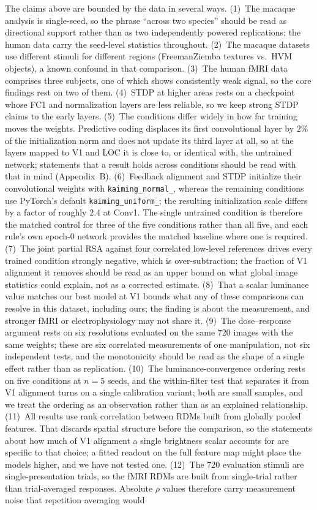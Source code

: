 \documentclass[10pt,twocolumn]{article}
\begin{document}
The claims above are bounded by the data in several ways. (1)~The macaque analysis is single-seed, so the phrase ``across two species'' should be read as directional support rather than as two independently powered replications; the human data carry the seed-level statistics throughout. (2)~The macaque datasets use different stimuli for different regions (FreemanZiemba textures vs.\ HVM objects), a known confound in that comparison. (3)~The human fMRI data comprises three subjects, one of which shows consistently weak signal, so the core findings rest on two of them. (4)~STDP at higher areas rests on a checkpoint whose FC1 and normalization layers are less reliable, so we keep strong STDP claims to the early layers. (5)~The conditions differ widely in how far training moves the weights. Predictive coding displaces its first convolutional layer by $2\%$ of the initialization norm and does not update its third layer at all, so at the layers mapped to V1 and LOC it is close to, or identical with, the untrained network; statements that a result holds across conditions should be read with that in mind (Appendix~B). (6)~Feedback alignment and STDP initialize their convolutional weights with \texttt{kaiming\_normal\_}, whereas the remaining conditions use PyTorch's default \texttt{kaiming\_uniform\_}; the resulting initialization scale differs by a factor of roughly $2.4$ at Conv1. The single untrained condition is therefore the matched control for three of the five conditions rather than all five, and each rule's own epoch-$0$ network provides the matched baseline where one is required. (7)~The joint partial RSA against four correlated low-level references drives every trained condition strongly negative, which is over-subtraction; the fraction of V1 alignment it removes should be read as an upper bound on what global image statistics could explain, not as a corrected estimate. (8)~That a scalar luminance value matches our best model at V1 bounds what any of these comparisons can resolve in this dataset, including ours; the finding is about the measurement, and stronger fMRI or electrophysiology may not share it. (9)~The dose--response argument rests on six resolutions evaluated on the same $720$ images with the same weights; these are six correlated measurements of one manipulation, not six independent tests, and the monotonicity should be read as the shape of a single effect rather than as replication. (10)~The luminance-convergence ordering rests on five conditions at $n=5$ seeds, and the within-filter test that separates it from V1 alignment turns on a single calibration variant; both are small samples, and we treat the ordering as an observation rather than as an explained relationship. (11)~All results use rank correlation between RDMs built from globally pooled features. That discards spatial structure before the comparison, so the statements about how much of V1 alignment a single brightness scalar accounts for are specific to that choice; a fitted readout on the full feature map might place the models higher, and we have not tested one. (12)~The $720$ evaluation stimuli are single-presentation trials, so the fMRI RDMs are built from single-trial rather than trial-averaged responses. Absolute $\rho$ values therefore carry measurement noise that repetition averaging would 
\end{document}
